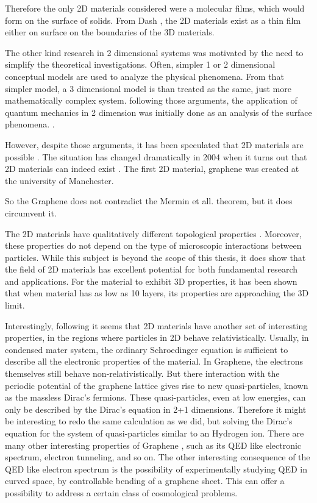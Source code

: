 Therefore the only 2D materials considered were a molecular films, which would form on the surface of solids. From Dash \cite{2DMatter1}, the 2D materials exist as a thin film either on surface on the boundaries of the 3D materials.

The other kind research in 2 dimensional systems was motivated by the need to simplify the theoretical investigations. Often, simpler 1 or 2 dimensional  conceptual models are used to analyze the physical phenomena. From that simpler model, a 3 dimensional model is than treated as the same, just more mathematically complex system.  following those arguments, the application of  quantum mechanics in 2 dimension was initially done as an analysis of the surface phenomena. \cite{2dfilm}. 

However, despite those arguments, it has been speculated that 2D materials are possible \cite{2DMatter1}. The situation has changed dramatically in 2004 when it turns out that 2D materials can indeed exist \cite{Graphene0}. The first 2D material, graphene was created \cite{GrapheneN} at the university of Manchester.

So the Graphene does not contradict the Mermin et all. theorem, but it does circumvent it.

The 2D materials have qualitatively different topological properties \cite{2DMatterCurvature}. Moreover, these properties do not depend on the type of microscopic interactions between particles. While this subject is beyond the scope of this thesis, it does show that the field of 2D materials has excellent potential for both fundamental research and applications. For the material to exhibit 3D properties, it has been shown \cite{GraphLayers} that when material has as low as 10 layers, its properties are approaching the 3D limit.

Interestingly, following \cite{Graphene0} it seems that 2D materials have another set of interesting properties, in the regions where particles in 2D behave relativistically. Usually, in condensed mater system, the ordinary Schroedinger equation is sufficient to describe all the electronic properties of the material. In Graphene, the electrons themselves still behave non-relativistically. But there interaction with the periodic potential of the graphene lattice gives rise to new quasi-particles, known as the massless Dirac's fermions. These quasi-particles, even at low energies, can only be described by the Dirac's equation in 2+1 dimensions. Therefore it might be interesting to redo the same calculation as we did, but solving the Dirac's equation for the system of quasi-particles similar to an Hydrogen ion.  There are many other interesting properties of Graphene \cite{Graphene0}, such as its QED like electronic spectrum, electron tunneling, and so on. The other interesting consequence of the QED like electron spectrum is the possibility of experimentally studying QED in curved space, by controllable bending of a graphene sheet. This can offer a possibility to address a certain class of cosmological problems. 

